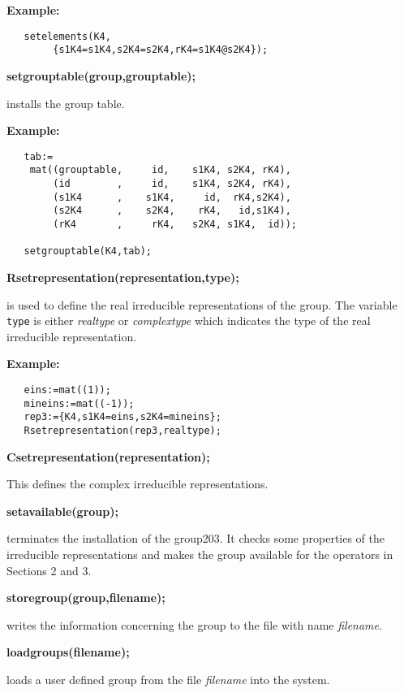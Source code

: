 \textbf{Example:}
\begin{verbatim}
   setelements(K4,
        {s1K4=s1K4,s2K4=s2K4,rK4=s1K4@s2K4});
\end{verbatim}

\textbf{setgrouptable(group,grouptable);}

installs the group table.

\textbf{Example:}
\begin{verbatim}
   tab:=
    mat((grouptable,     id,    s1K4, s2K4, rK4),
        (id        ,     id,    s1K4, s2K4, rK4),
        (s1K4      ,    s1K4,     id,  rK4,s2K4),
        (s2K4      ,    s2K4,    rK4,   id,s1K4),
        (rK4       ,     rK4,   s2K4, s1K4,  id));

   setgrouptable(K4,tab);
\end{verbatim}

\textbf{Rsetrepresentation(representation,type);}

is used to define the real irreducible representations of the group.
The variable \texttt{type} is either \emph{realtype} or \emph{complextype}
which indicates the type of the real irreducible representation.

\textbf{Example:}
\begin{verbatim}
   eins:=mat((1));
   mineins:=mat((-1));
   rep3:={K4,s1K4=eins,s2K4=mineins};
   Rsetrepresentation(rep3,realtype);
\end{verbatim}

\textbf{Csetrepresentation(representation);}

This defines the complex irreducible representations.

\textbf{setavailable(group);}

terminates the installation of the group203. It checks some properties of the
irreducible representations and makes the group available for the
operators in Sections 2 and 3.

\textbf{storegroup(group,filename);}

writes the information concerning the group to the file with name
\emph{filename}.

\textbf{loadgroups(filename);}

loads a user defined group from the file \emph{filename} into
the system.
